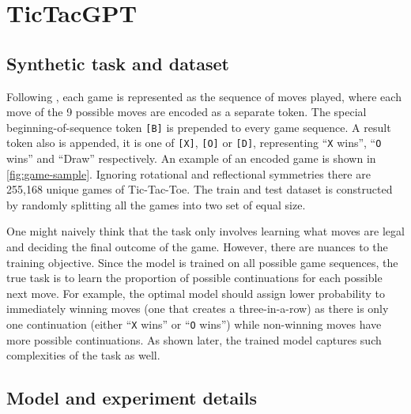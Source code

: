 \documentclass{article}
\newcommand{\ttgpt}{TicTacGPT\xspace}
\newcommand{\ttt}{Tic-Tac-Toe\xspace}
\begin{document}
\section{\ttgpt}

\subsection{Synthetic task and dataset}



Following \cite{orthello-gpt}, each game is represented as the sequence of moves played, where each move of the 9 possible moves are encoded as a separate token. The special beginning-of-sequence token \texttt{[B]} is prepended to every game sequence. A result token also is appended, it is one of \texttt{[X]}, \texttt{[O]} or \texttt{[D]}, representing ``\texttt{X} wins'', ``\texttt{O} wins'' and ``Draw'' respectively. An example of an encoded game is shown in \cref{fig:game-sample}. Ignoring rotational and reflectional symmetries there are 255,168 unique games of \ttt. The train and test dataset is constructed by randomly splitting all the games into two set of equal size.

One might naively think that the task only involves learning what moves are legal and deciding the final outcome of the game. However, there are nuances to the training objective. Since the model is trained on all possible game sequences, the true task is to learn the proportion of possible continuations for each possible next move. For example, the optimal model should assign lower probability to immediately winning moves (one that creates a three-in-a-row) as there is only one continuation (either ``\texttt{X} wins'' or ``\texttt{O} wins'') while non-winning moves have more possible continuations. As shown later, the trained model captures such complexities of the task as well.

\subsection{Model and experiment details}
\end{document}
